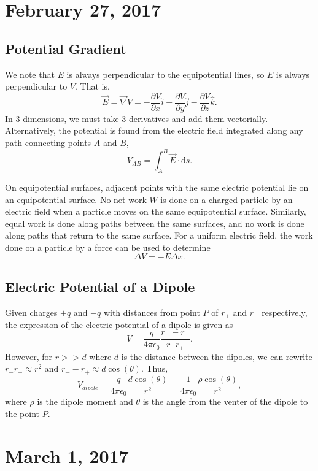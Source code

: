 \documentclass[11pt]{article}
\theoremstyle{plain} %
\theoremstyle{definition}
\theoremstyle{example}
\theoremstyle{remark}
\begin{document}
\section{February 27, 2017}
\subsection{Potential Gradient}

We note that $E$ is always perpendicular to the equipotential lines, so $E$ is always perpendicular to $V$. That is,
$$\vec{E} = \vec{\nabla}V = -\frac{\partial V}{\partial x}\hat{i}   -\frac{\partial V}{\partial y}\hat{j}-\frac{\partial V}{\partial z}\hat{k}.$$
In 3 dimensions, we must take 3 derivatives and add them vectorially. Alternatively, the potential is found from the electric field integrated along any path connecting points $A$ and $B$,
$$V_{AB} = \int_A^B\vec{E} \cdot \mathrm d s.$$

On equipotential surfaces, adjacent points with the same electric potential lie on an equipotential surface. No net work $W$ is done on a charged particle by an electric field when a particle moves on the same equipotential surface. Similarly, equal work is done along paths between the same surfaces, and no work is done along paths that return to the same surface. For a uniform electric field, the work done on a particle by a force can be used to determine 
$$\Delta V = - E \Delta x.$$


\subsection{Electric Potential of a Dipole}Given charges $+q$ and $-q$ with distances from point $P$ of $r_+$ and $r_-$ respectively, the expression of the electric potential of a dipole is given as 
$$V = \frac{q}{4 \pi \epsilon_0}\frac{r_--r_+}{r_-r_+}.$$
However, for $r >> d$ where $d$ is the distance between the dipoles, we can rewrite $r_-r_+ \approx r^2$ and $r_--r_+ \approx d \cos(\theta)$. Thus,
$$V_{dipole}= \frac{q}{4 \pi \epsilon_0}\frac{d\cos(\theta)}{r^2} = \frac{1}{4\pi\epsilon_0}\frac{\rho\cos(\theta)}{r^2},$$
where $\rho$ is the dipole moment and $\theta$ is the angle from the venter of the dipole to the point $P$.


\section{March 1, 2017}
\end{document}
